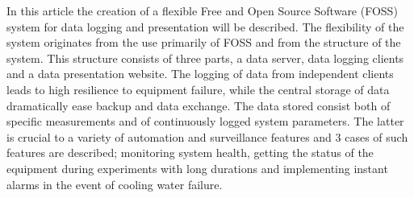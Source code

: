 In this article the creation of a flexible Free and Open Source
Software (FOSS) system for data logging and presentation will be
described. The flexibility of the system originates from the use
primarily of FOSS and from the structure of the system. This structure
consists of three parts, a data server, data logging clients and a
data presentation website. The logging of data from independent
clients leads to high resilience to equipment failure, while the
central storage of data dramatically ease backup and data
exchange. The data stored consist both of specific measurements and of
continuously logged system parameters. The latter is crucial to a
variety of automation and surveillance features and 3 cases of such
features are described; monitoring system health, getting the status of
the equipment during experiments with long durations and implementing
instant alarms in the event of cooling water failure.